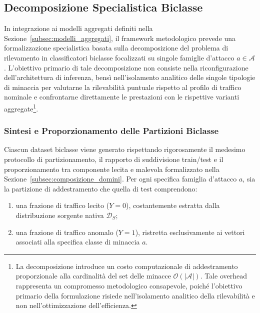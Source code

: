 \subsection{Decomposizione Specialistica Biclasse}
\label{subsec:modelli_biclasse}

In integrazione ai modelli aggregati definiti nella Sezione~\ref{subsec:modelli_aggregati}, il framework metodologico prevede una formalizzazione specialistica basata sulla decomposizione del problema di rilevamento in classificatori biclasse focalizzati su singole famiglie d'attacco $a \in \mathcal{A}$. L'obiettivo primario di tale decomposizione non consiste nella riconfigurazione dell'architettura di inferenza, bensì nell'isolamento analitico delle singole tipologie di minaccia per valutarne la rilevabilità puntuale rispetto al profilo di traffico nominale e confrontarne direttamente le prestazioni con le rispettive varianti aggregate\footnote{La decomposizione introduce un costo computazionale di addestramento proporzionale alla cardinalità del set delle minacce $\mathcal{O}(|\mathcal{A}|)$. Tale overhead rappresenta un compromesso metodologico consapevole, poiché l'obiettivo primario della formulazione risiede nell'isolamento analitico della rilevabilità e non nell'ottimizzazione dell'efficienza.}.

\subsubsection{Sintesi e Proporzionamento delle Partizioni Biclasse}
\label{subsubsec:sintesi_biclasse}
Ciascun dataset biclasse viene generato rispettando rigorosamente il medesimo protocollo di partizionamento, il rapporto di suddivisione train/test e il proporzionamento tra componente lecita e malevola formalizzato nella Sezione~\ref{subsec:composizione_domini}. Per ogni specifica famiglia d'attacco $a$, sia la partizione di addestramento che quella di test comprendono:
\begin{enumerate}
    \item una frazione di traffico lecito ($Y = 0$), costantemente estratta dalla distribuzione sorgente nativa $\mathcal{D}_S$;
    \item una frazione di traffico anomalo ($Y = 1$), ristretta esclusivamente ai vettori associati alla specifica classe di minaccia $a$.
\end{enumerate}


